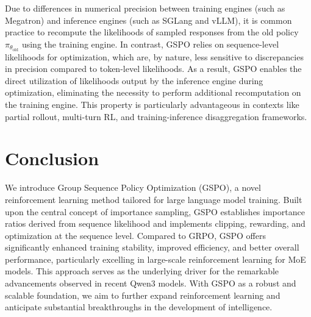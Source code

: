Due to differences in numerical precision between training engines (such as Megatron) and inference engines (such as SGLang and vLLM), it is common practice to recompute the likelihoods of sampled responses from the old policy $\pi_{\theta_\text{old}}$ using the training engine. In contrast, GSPO relies on sequence-level likelihoods for optimization, which are, by nature, less sensitive to discrepancies in precision compared to token-level likelihoods. As a result, GSPO enables the direct utilization of likelihoods output by the inference engine during optimization, eliminating the necessity to perform additional recomputation on the training engine. This property is particularly advantageous in contexts like partial rollout, multi-turn RL, and training-inference disaggregation frameworks.

\section{Conclusion}

We introduce Group Sequence Policy Optimization (GSPO), a novel reinforcement learning method tailored for large language model training. Built upon the central concept of importance sampling, GSPO establishes importance ratios derived from sequence likelihood and implements clipping, rewarding, and optimization at the sequence level. Compared to GRPO, GSPO offers significantly enhanced training stability, improved efficiency, and better overall performance, particularly excelling in large-scale reinforcement learning for MoE models. This approach serves as the underlying driver for the remarkable advancements observed in recent Qwen3 models. With GSPO as a robust and scalable foundation, we aim to further expand reinforcement learning and anticipate substantial breakthroughs in the development of intelligence.

